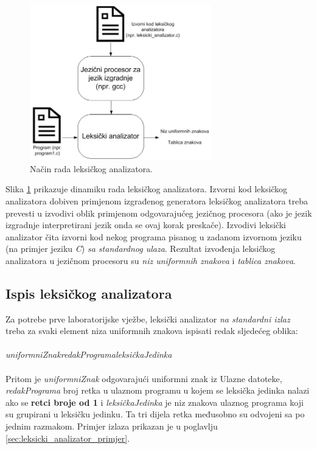 \documentclass[times, 12pt, utf8]{book}
\begin{document}
\begin{figure}[htb!]
\centering
\includegraphics[width=0.7\textwidth]{slike/leksicki-analizator.jpg}
\caption{Način rada leksičkog analizatora.}
\label{fig:leksicki-analizator}
\end{figure}

Slika \ref{fig:leksicki-analizator} prikazuje dinamiku rada leksičkog analizatora.
Izvorni kod leksičkog analizatora dobiven primjenom izgrađenog generatora leksičkog analizatora treba prevesti u izvodivi oblik primjenom odgovarajućeg jezičnog procesora (ako je jezik izgradnje interpretirani jezik onda se ovaj korak preskače).
Izvodivi leksički analizator čita izvorni kod nekog programa pisanog u zadanom izvornom jeziku (na primjer jeziku \emph{C}) \emph{sa standardnog ulaza}.
Rezultat izvođenja leksičkog analizatora u jezičnom procesoru su \emph{niz uniformnih znakova} i \emph{tablica znakova}.

\subsection{Ispis leksičkog analizatora}
Za potrebe prve laboratorijske vježbe, leksički analizator \emph{na standardni izlaz} treba za svaki element niza uniformnih znakova ispisati redak sljedećeg oblika:\\
\\
\emph{uniformniZnak}\textvisiblespace\emph{redakPrograma}\textvisiblespace\emph{leksičkaJedinka}\\
\\
Pritom je \emph{uniformniZnak} odgovarajući uniformni znak iz Ulazne datoteke, \emph{redakPrograma} broj retka u ulaznom programu u kojem se leksička jedinka nalazi ako se \textbf{retci broje od 1} i \emph{leksičkaJedinka} je niz znakova ulaznog programa koji su grupirani u leksičku jedinku.
Ta tri dijela retka međusobno su odvojeni sa po jednim razmakom.
Primjer izlaza prikazan je u poglavlju \ref{sec:leksicki_analizator_primjer}.
\end{document}
